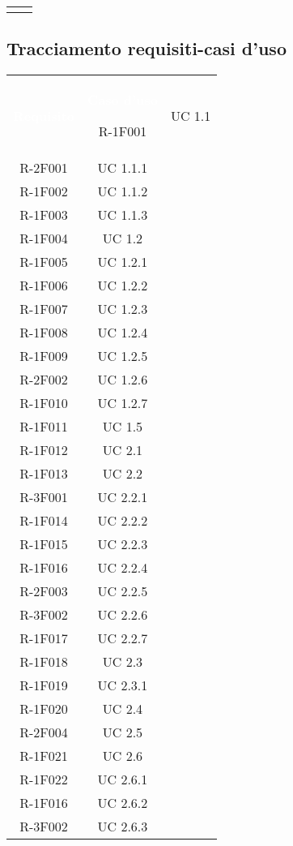 \begin{tabularx}{\textwidth}{c|c}
	
	\rowcolor{white}
	\caption{Tabella tracciamento casi d'uso-requisiti} \label{tab:tabellacasirequisiti}
\end{tabularx}



\subsection{Tracciamento requisiti-casi d'uso} 

\begin{tabularx}{\textwidth}{c|c}
	\rowcolor{greySWEight}
	\textcolor{white}{\textbf{Requisito}} &
	\textcolor{white}{\textbf{Caso d'uso}}\endhead

		R-1F001 & UC 1.1 \\
		R-2F001 & UC 1.1.1 \\
		R-1F002 & UC 1.1.2 \\
		R-1F003 & UC 1.1.3 \\
		R-1F004 & UC 1.2 \\
		R-1F005 & UC 1.2.1 \\
		R-1F006 & UC 1.2.2 \\
		R-1F007 & UC 1.2.3 \\
		R-1F008 & UC 1.2.4 \\
		R-1F009 & UC 1.2.5 \\
		R-2F002 & UC 1.2.6 \\
		R-1F010 & UC 1.2.7 \\
		R-1F011 & UC 1.5 \\
		R-1F012 & UC 2.1 \\
		R-1F013 & UC 2.2 \\
		R-3F001 & UC 2.2.1 \\
		R-1F014 & UC 2.2.2 \\
		R-1F015 & UC 2.2.3 \\
		R-1F016 & UC 2.2.4 \\
		R-2F003 & UC 2.2.5 \\
		R-3F002 & UC 2.2.6 \\
		R-1F017 & UC 2.2.7 \\
		R-1F018 & UC 2.3 \\
		R-1F019 & UC 2.3.1 \\
		R-1F020 & UC 2.4 \\
		R-2F004 & UC 2.5 \\
		R-1F021 & UC 2.6 \\
		R-1F022 & UC 2.6.1 \\
		R-1F016 & UC 2.6.2 \\
		R-3F002 & UC 2.6.3 \\

\end{tabularx}
